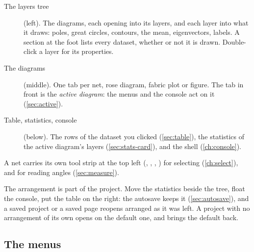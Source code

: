 \begin{description}
\item[The layers tree] (left). The diagrams, each opening into its layers, and each layer into what it
draws: poles, great circles, contours, the mean, eigenvectors, labels. A  section at the foot
lists every dataset, whether or not it is drawn. Double-click a layer for its properties.
\item[The diagrams] (middle). One tab per net, rose diagram, fabric plot or figure. The tab in front is
the \emph{active diagram}: the menus and the console act on it (\cref{sec:active}).
\item[Table, statistics, console] (below). The rows of the dataset you clicked (\cref{sec:table}), the
statistics of the active diagram's layers (\cref{sec:stats-card}), and the shell (\cref{ch:console}).
\end{description}

A net carries its own tool strip at the top left (, , , ) for
selecting (\cref{ch:select}), and  for reading angles (\cref{sec:measure}).

The arrangement is part of the project. Move the statistics beside the tree, float the console, put
the table on the right: the autosave keeps it (\cref{sec:autosave}), and a saved project or a saved page
reopens arranged as it was left. A project with no arrangement of its own opens on the default one, and
 brings the default back.


\subsection{The menus}

